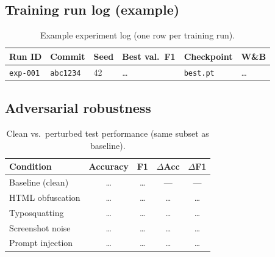 
\subsection*{Training run log (example)}
\begin{table}[htbp]
  \centering
  \small
  \caption{Example experiment log (one row per training run).}
  \label{tab:exp-log}
  \begin{tabular}{llllll}
    \toprule
    Run ID & Commit & Seed & Best val.\ F1 & Checkpoint & W\&B \\
    \midrule
    \texttt{exp-001} & \texttt{abc1234} & 42 & \ldots & \texttt{best.pt} & \ldots \\
    \bottomrule
  \end{tabular}
\end{table}

\subsection*{Adversarial robustness}
\begin{table}[htbp]
  \centering
  \caption{Clean vs.\ perturbed test performance (same subset as baseline).}
  \label{tab:adversarial}
  \begin{tabular}{lcccc}
    \toprule
    Condition & Accuracy & F1 & $\Delta$Acc & $\Delta$F1 \\
    \midrule
    Baseline (clean) & \ldots & \ldots & --- & --- \\
    HTML obfuscation & \ldots & \ldots & \ldots & \ldots \\
    Typosquatting    & \ldots & \ldots & \ldots & \ldots \\
    Screenshot noise & \ldots & \ldots & \ldots & \ldots \\
    Prompt injection & \ldots & \ldots & \ldots & \ldots \\
    \bottomrule
  \end{tabular}
\end{table}

%
%
%
